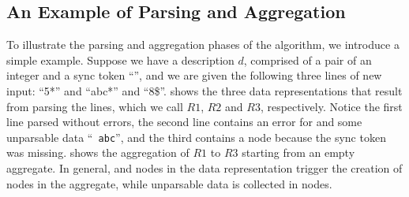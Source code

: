 





\subsection{An Example of Parsing and Aggregation}
To illustrate the parsing and aggregation phases of the algorithm, we
introduce a simple example.
Suppose we have a description $d$, comprised of a pair of an integer and a sync token ``\cd{*}'',
and we are given the following three lines of new input: ``5*'' and
``abc*'' and ``8\$''.
 shows the three data representations that result
from parsing the lines, which we call $R1$, $R2$ and $R3$,
respectively. Notice the first line parsed without errors, the second
line contains an error for  and some unparsable data ``{\tt
  abc}'', and the third contains a  node because the
sync token \cd{*} was missing.   shows the aggregation
of $R1$ to $R3$ starting from an empty aggregate. In
general,  and  nodes in the data representation
trigger the creation of  nodes in the aggregate, while
unparsable data is collected in  nodes.

